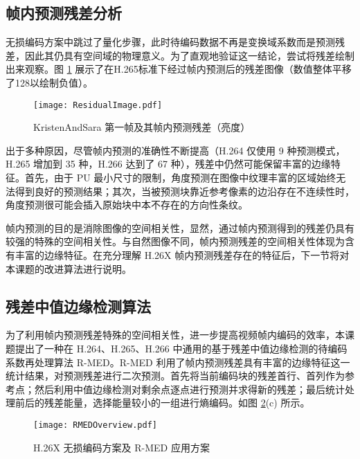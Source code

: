 \subsection{帧内预测残差分析}
无损编码方案中跳过了量化步骤，此时待编码数据不再是变换域系数而是预测残差，因此其仍具有空间域的物理意义。为了直观地验证这一结论，尝试将残差绘制出来观察。图 \ref{fig:ResidualImage} 展示了在H.265标准下经过帧内预测后的残差图像（数值整体平移了128以绘制负值）。
\begin{figure}[hbt]
    \centering
    \texttt{[image: ResidualImage.pdf]}
    \caption{KristenAndSara 第一帧及其帧内预测残差（亮度）}
    \label{fig:ResidualImage}
\end{figure}

出于多种原因，尽管帧内预测的准确性不断提高（H.264 仅使用 9 种预测模式，H.265 增加到 35 种，H.266 达到了 67 种），残差中仍然可能保留丰富的边缘特征。首先，由于 PU 最小尺寸的限制，角度预测在图像中纹理丰富的区域始终无法得到良好的预测结果；其次，当被预测块靠近参考像素的边沿存在不连续性时，角度预测很可能会插入原始块中本不存在的方向性条纹。

帧内预测的目的是消除图像的空间相关性，显然，通过帧内预测得到的残差仍具有较强的特殊的空间相关性。与自然图像不同，帧内预测残差的空间相关性体现为含有丰富的边缘特征。在充分理解 H.26X 帧内预测残差存在的特征后，下一节将对本课题的改进算法进行说明。

\subsection{残差中值边缘检测算法}
为了利用帧内预测残差特殊的空间相关性，进一步提高视频帧内编码的效率，本课题提出了一种在 H.264、H.265、H.266 中通用的基于残差中值边缘检测的待编码系数再处理算法 R-MED。R-MED 利用了帧内预测残差具有丰富的边缘特征这一统计结果，对预测残差进行二次预测。首先将当前编码块的残差首行、首列作为参考点；然后利用中值边缘检测对剩余点逐点进行预测并求得新的残差；最后统计处理前后的残差能量，选择能量较小的一组进行熵编码。如图 \ref{fig:RMEDOverview}(c) 所示。
\begin{figure}[hbt]
    \centering
    \texttt{[image: RMEDOverview.pdf]}
    \caption{H.26X 无损编码方案及 R-MED 应用方案}
    \label{fig:RMEDOverview}
\end{figure}

